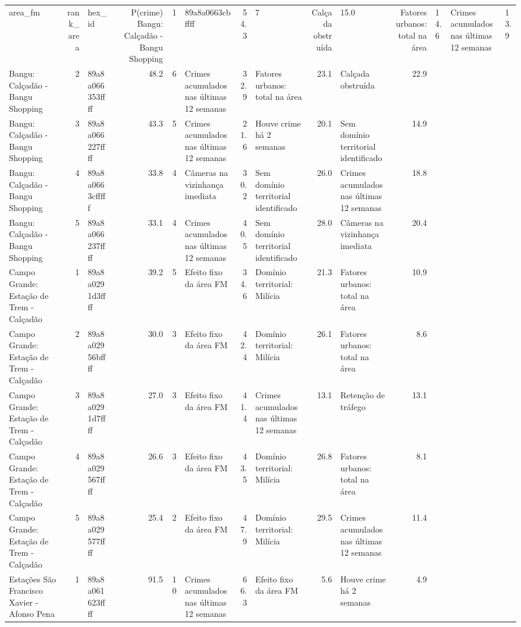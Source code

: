 \begin{tabular}{lrlrrlrlrlr}
\toprule
area_fm & rank_area & hex_id & P(crime)%
\midrule
Bangu: Calçadão - Bangu Shopping & 1 & 89a8a0663cbffff & 54.3 & 7 & Calçada obstruída & 15.0 & Fatores urbanos: total na área & 14.6 & Crimes acumulados nas últimas 12 semanas & 13.9 \\
Bangu: Calçadão - Bangu Shopping & 2 & 89a8a066353ffff & 48.2 & 6 & Crimes acumulados nas últimas 12 semanas & 32.9 & Fatores urbanos: total na área & 23.1 & Calçada obstruída & 22.9 \\
Bangu: Calçadão - Bangu Shopping & 3 & 89a8a066227ffff & 43.3 & 5 & Crimes acumulados nas últimas 12 semanas & 21.6 & Houve crime há 2 semanas & 20.1 & Sem domínio territorial identificado & 14.9 \\
Bangu: Calçadão - Bangu Shopping & 4 & 89a8a0663cfffff & 33.8 & 4 & Câmeras na vizinhança imediata & 30.2 & Sem domínio territorial identificado & 26.0 & Crimes acumulados nas últimas 12 semanas & 18.8 \\
Bangu: Calçadão - Bangu Shopping & 5 & 89a8a066237ffff & 33.1 & 4 & Crimes acumulados nas últimas 12 semanas & 40.5 & Sem domínio territorial identificado & 28.0 & Câmeras na vizinhança imediata & 20.4 \\
Campo Grande: Estação de Trem - Calçadão & 1 & 89a8a0291d3ffff & 39.2 & 5 & Efeito fixo da área FM & 34.6 & Domínio territorial: Milícia & 21.3 & Fatores urbanos: total na área & 10.9 \\
Campo Grande: Estação de Trem - Calçadão & 2 & 89a8a02956bffff & 30.0 & 3 & Efeito fixo da área FM & 42.4 & Domínio territorial: Milícia & 26.1 & Fatores urbanos: total na área & 8.6 \\
Campo Grande: Estação de Trem - Calçadão & 3 & 89a8a0291d7ffff & 27.0 & 3 & Efeito fixo da área FM & 41.4 & Crimes acumulados nas últimas 12 semanas & 13.1 & Retenção de tráfego & 13.1 \\
Campo Grande: Estação de Trem - Calçadão & 4 & 89a8a029567ffff & 26.6 & 3 & Efeito fixo da área FM & 43.5 & Domínio territorial: Milícia & 26.8 & Fatores urbanos: total na área & 8.1 \\
Campo Grande: Estação de Trem - Calçadão & 5 & 89a8a029577ffff & 25.4 & 2 & Efeito fixo da área FM & 47.9 & Domínio territorial: Milícia & 29.5 & Crimes acumulados nas últimas 12 semanas & 11.4 \\
Estações São Francisco Xavier - Afonso Pena & 1 & 89a8a061623ffff & 91.5 & 10 & Crimes acumulados nas últimas 12 semanas & 66.3 & Efeito fixo da área FM & 5.6 & Houve crime há 2 semanas & 4.9 \\

\end{tabular}
